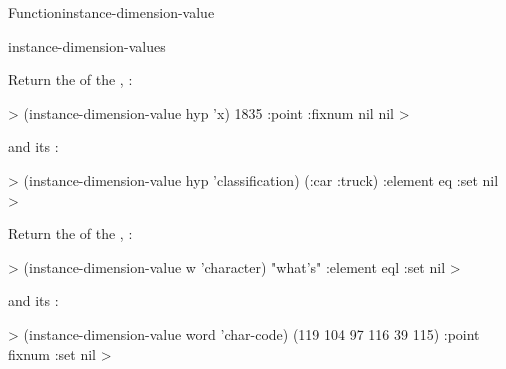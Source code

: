 \documentclass[10pt,twoside,english,pdftex]{article}
\begin{document}
\begin{functiondoc}{Function}{instance-dimension-value}
\begin{alsos}{instance-dimension-values}
\end{alsos}

\fnexamples
%
Return the   of the ,
:
%
\W\supp
\begin{example}
  > (instance-dimension-value hyp 'x)
  1835
  :point
  :fixnum
  nil
  nil
  >
\end{example}
%
and its  :
%
\W\supp\notpretop
\begin{example}
  > (instance-dimension-value hyp 'classification)
  (:car :truck)
  :element
  eq
  :set
  nil
  >
\end{example}

Return the   of the
, :
%
\W\supp
\begin{example}
  > (instance-dimension-value w 'character)
  "what's"
  :element
  eql
  :set
  nil
  >
\end{example}
%
and its  :
%
\W\supp\notpretop
\begin{example}
  > (instance-dimension-value word 'char-code)
  (119 104 97 116 39 115)
  :point
  fixnum
  :set
  nil
  >
\end{example}

\end{functiondoc}

\end{document}
